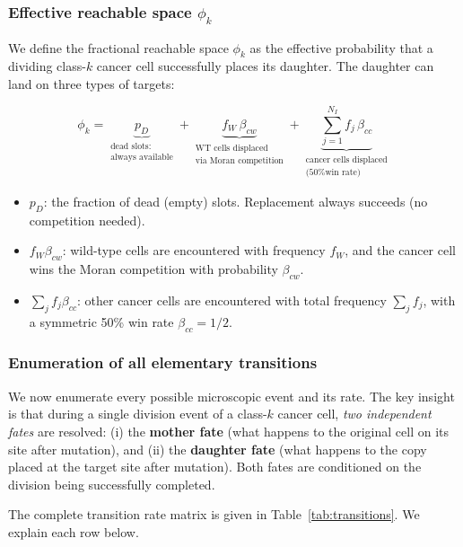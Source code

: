 \documentclass[11pt,a4paper]{article}
\begin{document}
\subsubsection*{Effective reachable space $\phi_k$}

We define the fractional reachable space $\phi_k$ as the effective probability that a dividing class-$k$ cancer cell successfully places its daughter. The daughter can land on three types of targets:

\begin{equation}
    \phi_k = \underbrace{p_D}_{\substack{\text{dead slots:}\\\text{always available}}}
           + \underbrace{f_W\,\beta_{cw}}_{\substack{\text{WT cells displaced}\\\text{via Moran competition}}}
           + \underbrace{\sum_{j=1}^{N_I} f_j\,\beta_{cc}}_{\substack{\text{cancer cells displaced}\\\text{(50\% win rate)}}}
\end{equation}

\begin{itemize}
    \item $p_D$: the fraction of dead (empty) slots. Replacement always succeeds (no competition needed).
    \item $f_W \beta_{cw}$: wild-type cells are encountered with frequency $f_W$, and the cancer cell wins the Moran competition with probability $\beta_{cw}$.
    \item $\sum_j f_j \beta_{cc}$: other cancer cells are encountered with total frequency $\sum_j f_j$, with a symmetric 50\% win rate $\beta_{cc} = 1/2$.
\end{itemize}

\subsubsection*{Enumeration of all elementary transitions}

We now enumerate every possible microscopic event and its rate. The key insight is that during a single division event of a class-$k$ cancer cell, \emph{two independent fates} are resolved: (i) the \textbf{mother fate} (what happens to the original cell on its site after mutation), and (ii) the \textbf{daughter fate} (what happens to the copy placed at the target site after mutation). Both fates are conditioned on the division being successfully completed.

The complete transition rate matrix is given in Table~\ref{tab:transitions}. We explain each row below.
\end{document}
